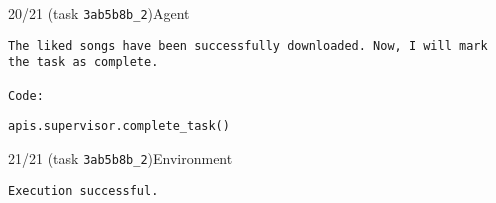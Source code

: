 \begin{minipage}{0.95\linewidth}
\begin{assistant_message_box}{{20/21 (task \texttt{3ab5b8b\_2})\hfill Agent}}
\scriptsize
\begin{Verbatim}[breaklines]
The liked songs have been successfully downloaded. Now, I will mark the task as complete.

Code:
\end{Verbatim}
\begin{tcolorbox}[colback=codebgcolor,boxrule=0pt]\begin{Verbatim}[breaklines]
apis.supervisor.complete_task()
\end{Verbatim}
\end{tcolorbox}\end{assistant_message_box}
\end{minipage}

\hspace*{8mm}%
\begin{minipage}{0.95\linewidth}
\begin{user_message_box}{{21/21 (task \texttt{3ab5b8b\_2})\hfill Environment}}
\scriptsize
\begin{Verbatim}[breaklines]
Execution successful.
\end{Verbatim}
\end{user_message_box}
\end{minipage}